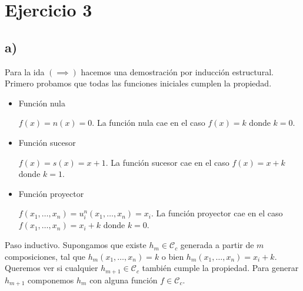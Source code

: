 \section*{Ejercicio 3}

\subsection*{a)}

Para la ida $(\implies)$ hacemos una demostración por inducción estructural. Primero probamos que todas las funciones iniciales cumplen la propiedad.

\begin{itemize}
    \item Función nula

    $f(x) = n(x) = 0$. La función nula cae en el caso $f(x) = k$ donde $k = 0$.

    \item Función sucesor

    $f(x) = s(x) = x + 1$. La función sucesor cae en el caso $f(x) = x + k$ donde $k = 1$.

    \item Función proyector

    $f(x_1, \dots, x_n) = u^n_i(x_1, \dots, x_n) = x_i$. La función proyector cae en el caso $f(x_1, \dots, x_n) = x_i + k$ donde $k = 0$.
\end{itemize}

Paso inductivo. Supongamos que existe $h_m \in \mathcal{C}_c$ generada a partir de $m$ composiciones, tal que $h_m(x_1, \dots, x_n) = k$ o bien $h_m(x_1, \dots, x_n) = x_i + k$. Queremos ver si cualquier $h_{m+1} \in \mathcal{C}_c$ también cumple la propiedad. Para generar $h_{m+1}$ componemos $h_m$ con alguna función $f \in \mathcal{C}_c$.

